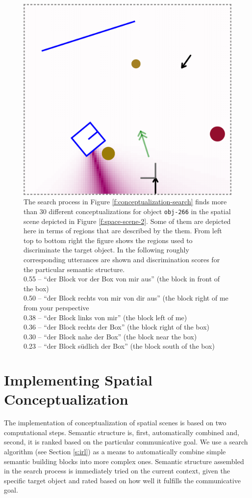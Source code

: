 \begin{figure}
\begin{centering}
\hspace{1pt}
\includegraphics[width=0.3\columnwidth]{figs/conceptualization-south-of-the-box-from-my-perspective-region.png}

\caption[Conceptualization examples]
{The search process in Figure \ref{f:conceptualization-search} finds more than
30 different conceptualizations for object {\footnotesize\tt obj-266} 
in the spatial scene depicted in Figure \ref{f:space-scene-2}.
Some of them are depicted here in terms of regions that are 
described by the them. From left top to bottom right the figure
shows the regions used to discriminate the target object. In the
following roughly corresponding utterances are shown and discrimination scores
for the particular semantic structure.\\
0.55 -- ``der Block vor der Box von mir aus'' (the block in front of the box)\\
0.50 -- ``der Block rechts von mir von dir aus'' (the block right of me from your perspective\\
0.38 -- ``der Block links von mir'' (the block left of me)\\
0.36 -- ``der Block rechts der Box'' (the block right of the box)\\
0.30 -- ``der Block nahe der Box'' (the block near the box)\\
0.23 -- ``der Block s\"udlich der Box'' (the block south of the box)}
\label{f:conceptualization-results}
\end{centering}
\end{figure}

\section{Implementing Spatial Conceptualization}
The implementation of conceptualization of spatial scenes is based on 
two computational steps. Semantic structure is, first, automatically
combined and, second, it is ranked based on the particular
communicative goal. We use a search algorithm 
(see Section \ref{s:irl}) as a means to 
automatically combine simple semantic building blocks 
into more complex ones. Semantic structure assembled in the search process is 
immediately tried on the current context, given the specific 
target object and rated based on how well it fulfills the communicative goal. 

